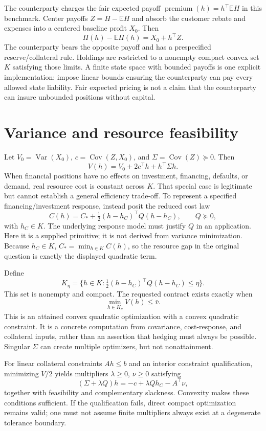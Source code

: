 \documentclass[11pt]{article}
\newcommand{\E}{\mathbb E}
\newcommand{\Var}{\operatorname{Var}}
\newcommand{\Cov}{\operatorname{Cov}}
\begin{document}
The counterparty charges the fair expected payoff $\operatorname{premium}(h)=h^\top\E H$ in this benchmark. Center payoffs $Z=H-\E H$ and absorb the customer rebate and expenses into a centered baseline profit $X_0$. Then
\[
 \Pi(h)-\E\Pi(h)=X_0+h^\top Z.
\]
The counterparty bears the opposite payoff and has a prespecified reserve/collateral rule. Holdings are restricted to a nonempty compact convex set $K$ satisfying those limits. A finite state space with bounded payoffs is one explicit implementation: impose linear bounds ensuring the counterparty can pay every allowed state liability. Fair expected pricing is not a claim that the counterparty can insure unbounded positions without capital.

\section*{Variance and resource feasibility}
Let $V_0=\Var(X_0)$, $c=\Cov(Z,X_0)$, and $\Sigma=\Cov(Z)\succeq0$. Then
\[
 V(h)=V_0+2c^\top h+h^\top\Sigma h.
\]
When financial positions have no effects on investment, financing, defaults, or demand, real resource cost is constant across $K$. That special case is legitimate but cannot establish a general efficiency trade-off. To represent a specified financing/investment response, instead posit the reduced cost law
\[
 C(h)=C_*+\tfrac12(h-h_C)^\top Q(h-h_C),\qquad Q\succeq0,
\]
with $h_C\in K$. The underlying response model must justify $Q$ in an application. Here it is a supplied primitive; it is not derived from variance minimization. Because $h_C\in K$, $C_*=\min_{h\in K}C(h)$, so the resource gap in the original question is exactly the displayed quadratic term.

Define
\[
 K_\eta=\{h\in K:\tfrac12(h-h_C)^\top Q(h-h_C)\leq\eta\}.
\]
This set is nonempty and compact. The requested contract exists exactly when
\[
 \boxed{\min_{h\in K_\eta}V(h)\leq\bar v.}
\]
This is an attained convex quadratic optimization with a convex quadratic constraint. It is a concrete computation from covariance, cost-response, and collateral inputs, rather than an assertion that hedging must always be possible. Singular $\Sigma$ can create multiple optimizers, but not nonattainment.

For linear collateral constraints $Ah\leq b$ and an interior constraint qualification, minimizing $V/2$ yields multipliers $\lambda\geq0$, $\nu\geq0$ satisfying
\[
 (\Sigma+\lambda Q)h=-c+\lambda Qh_C-A^\top\nu,
\]
together with feasibility and complementary slackness. Convexity makes these conditions sufficient. If the qualification fails, direct compact optimization remains valid; one must not assume finite multipliers always exist at a degenerate tolerance boundary.
\end{document}
